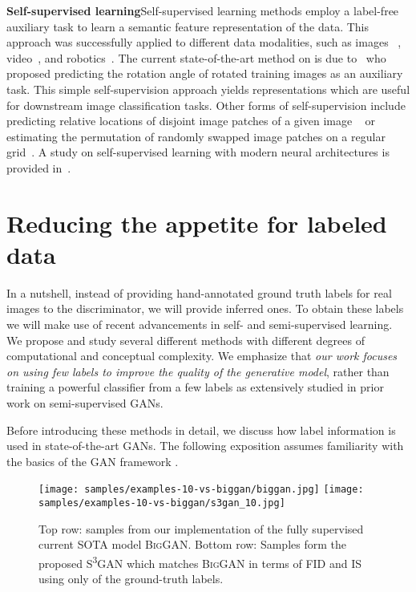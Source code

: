\documentclass{article}
\newcommand{\tranSSS}{\textsc{S\textsuperscript{3}GAN}}
\newcommand{\biggan}{\textsc{BigGAN}}
\begin{document}
\textbf{Self-supervised learning}\quad Self-supervised learning methods employ a label-free auxiliary task to learn a semantic feature representation of the data. This approach was successfully applied to different data modalities, such as images ~\citep{doersch2015unsupervised, caron2018deep}, video~\citep{agrawal2015learning,lee2017unsupervised}, and robotics~\citep{jang2018grasp2vec,pinto2016supersizing}. The current state-of-the-art method on \imagenet{} is due to~\citet{gidaris2018unsupervised} who proposed predicting the rotation angle of rotated training images as an auxiliary task. This simple self-supervision approach yields representations which are useful for downstream image classification tasks. Other forms of self-supervision include predicting relative locations of disjoint image patches of a given image ~\citep{doersch2015unsupervised, mundhenk2018improvements} or estimating the permutation of randomly swapped image patches on a regular grid~\citep{noroozi2016unsupervised}. A study on self-supervised learning with modern neural architectures is provided in~\citet{kolesnikov2019revisiting}.


\section{Reducing the appetite for labeled data}
In a nutshell, instead of providing hand-annotated ground truth labels for real images to the discriminator, we will provide inferred ones. To obtain these labels we will make use of recent advancements in self- and semi-supervised learning. We propose and study several different methods with different degrees of computational and conceptual complexity. We emphasize that \emph{our work focuses on using few labels to improve the quality of the generative model}, rather than training a powerful classifier from a few labels as extensively studied in prior work on semi-supervised GANs. 

Before introducing these methods in detail, we discuss how label information is used in state-of-the-art GANs. The following exposition assumes familiarity with the basics of the GAN framework \cite{goodfellow2014generative}. 

\begin{figure}[t]
\centering
\texttt{[image: samples/examples-10-vs-biggan/biggan.jpg]}
\texttt{[image: samples/examples-10-vs-biggan/s3gan\_10.jpg]}
\caption{Top row:  samples from our implementation of the fully supervised current SOTA model \biggan{}. Bottom row: Samples form the proposed \tranSSS{} which matches \biggan{} in terms of FID and IS using only  of the ground-truth labels.} 
\end{figure}
\end{document}
